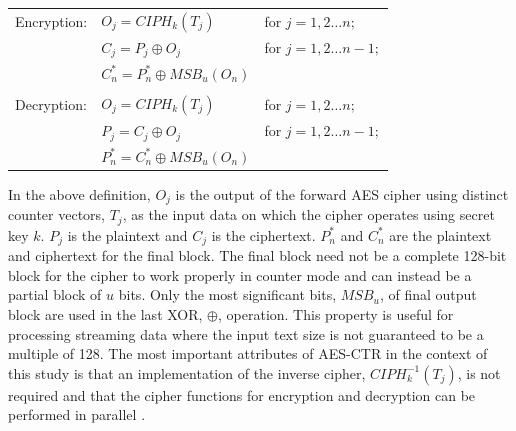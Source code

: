 \documentclass[12pt,journal,compsoc,onecolumn]{IEEEtran}
\begin{document}
\begin{table}[h]
	\centering
	\begin{tabular}{l l l}
	Encryption: & $O_j=CIPH_k(T_j)$ & for $j=1,2\dots n;$\\
		 & $C_j=P_j\oplus O_j$ & for $j=1,2\dots n-1;$\\
		 & $C^*_n=P^*_n\oplus MSB_u(O_n)$ & \\
		 \\
	Decryption: & $O_j=CIPH_k(T_j)$ & for $j=1,2\dots n;$\\
		 & $P_j=C_j\oplus O_j$ & for $j=1,2\dots n-1;$\\
		 & $P^*_n=C^*_n\oplus MSB_u(O_n)$ & 
	\end{tabular}
	\label{tab:ctr}
\end{table}

In the above definition, $O_j$ is the output of the forward AES cipher using distinct counter vectors, $T_j$, as the input data on which the cipher operates using secret key $k$. $P_j$ is the plaintext and $C_j$ is the ciphertext. $P^*_n$ and $C^*_n$ are the plaintext and ciphertext for the final block. The final block need not be a complete 128-bit block for the cipher to work properly in counter mode and can instead be a partial block of $u$ bits. Only the most significant bits, $MSB_u$, of final output block are used in the last XOR, $\oplus$, operation.  This property is useful for processing streaming data where the input text size is not guaranteed to be a multiple of 128\cite{15}\cite{16}. The most important attributes of AES-CTR in the context of this study is that an implementation of the inverse cipher, $CIPH^{-1}_k(T_j)$, is not required and that the cipher functions for encryption and decryption can be performed in parallel \cite{10}.

\end{document}
